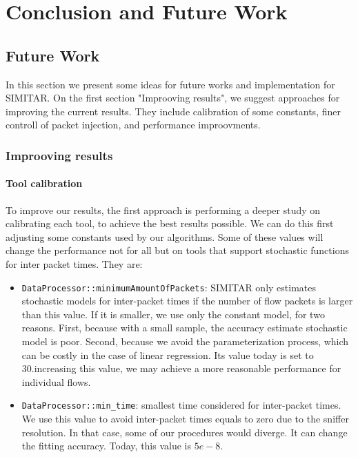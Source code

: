 \chapter{Conclusion and Future Work}\label{ch:conclusion}





\section{Future Work}

In this section we present some ideas for future works and implementation for SIMITAR. On the first section "Improoving results", we suggest approaches for improving the current results. They include calibration of some constants, finer controll of packet injection, and performance improovments. 

\subsection{Improoving results}

\subsubsection{Tool calibration}

To improve our results, the first approach is performing a deeper study on calibrating each tool, to achieve the best results possible. We can do this first adjusting some constants used by our algorithms. Some of these values will change the performance not for all but on tools that support stochastic functions for inter packet times. They are:

\begin{itemize}
	\item \texttt{DataProcessor::minimumAmountOfPackets}: SIMITAR only estimates stochastic models for inter-packet times if the number of flow packets is larger than this value. If it is smaller, we use only the constant model, for two reasons. First, because with a small sample, the accuracy estimate stochastic model is poor. Second, because we avoid the parameterization process, which can be costly in the case of linear regression. Its value today is set to 30.increasing this value, we may achieve a more reasonable performance for individual flows. 
	\item \texttt{DataProcessor::min\_time}: smallest time considered for inter-packet times. We use this value to avoid inter-packet times equals to zero due to the sniffer resolution. In that case, some of our procedures would diverge. It can change the fitting accuracy. Today, this value is $5e-8$. 
\end{itemize}


